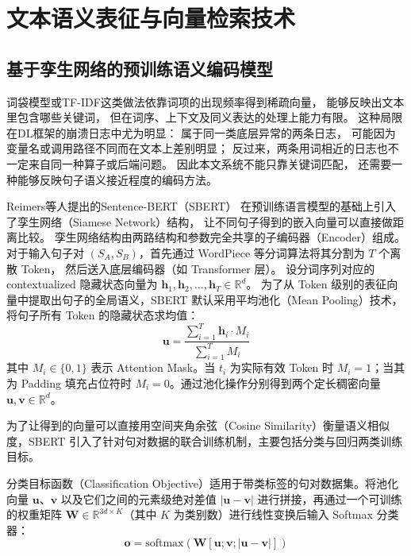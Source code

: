 \section{文本语义表征与向量检索技术}

\subsection{基于孪生网络的预训练语义编码模型}

词袋模型或TF-IDF这类做法依靠词项的出现频率得到稀疏向量，
能够反映出文本里包含哪些关键词，
但在词序、上下文及同义表达的处理上能力有限\cite{ref_tfidf}。
这种局限在DL框架的崩溃日志中尤为明显：
属于同一类底层异常的两条日志，
可能因为变量名或调用路径不同而在文本上差别明显；
反过来，两条用词相近的日志也不一定来自同一种算子或后端问题。
因此本文系统不能只靠关键词匹配，
还需要一种能够反映句子语义接近程度的编码方法。

Reimers等人提出的Sentence-BERT（SBERT）\cite{ref_sbert}
在预训练语言模型的基础上引入了孪生网络（Siamese Network）结构，
让不同句子得到的嵌入向量可以直接做距离比较。
孪生网络结构由两路结构和参数完全共享的子编码器（Encoder）组成。
对于输入句子对 $(S_A, S_B)$，首先通过 WordPiece 等分词算法将其分割为 $T$ 个离散 Token，
然后送入底层编码器（如 Transformer 层）。
设分词序列对应的 contextualized 隐藏状态向量为 $\mathbf{h}_1, \mathbf{h}_2, \dots, \mathbf{h}_T \in \mathbb{R}^d$。
为了从 Token 级别的表征向量中提取出句子的全局语义，SBERT 默认采用平均池化（Mean Pooling）技术，
将句子所有 Token 的隐藏状态求均值：
\begin{equation}
\label{eq:mean_pooling}
\mathbf{u} = \frac{\displaystyle\sum_{i=1}^{T} \mathbf{h}_i \cdot M_i}{\displaystyle\sum_{i=1}^{T} M_i}
\end{equation}
其中 $M_i \in \{0, 1\}$ 表示 Attention Mask。当 $t_i$ 为实际有效 Token 时 $M_i = 1$；当其为 Padding 填充占位符时 $M_i = 0$。通过池化操作分别得到两个定长稠密向量 $\mathbf{u}, \mathbf{v} \in \mathbb{R}^d$。

为了让得到的向量可以直接用空间夹角余弦（Cosine Similarity）衡量语义相似度，SBERT 引入了针对句对数据的联合训练机制，主要包括分类与回归两类训练目标。

分类目标函数（Classification Objective）适用于带类标签的句对数据集。将池化向量 $\mathbf{u}$、$\mathbf{v}$ 以及它们之间的元素级绝对差值 $|\mathbf{u} - \mathbf{v}|$ 进行拼接，再通过一个可训练的权重矩阵 $\mathbf{W} \in \mathbb{R}^{3d \times K}$（其中 $K$ 为类别数）进行线性变换后输入 Softmax 分类器：
\begin{equation}
\label{eq:sbert_classification}
\mathbf{o} = \text{softmax}\left(\mathbf{W} [\mathbf{u}; \mathbf{v}; |\mathbf{u} - \mathbf{v}|]\right)
\end{equation}


